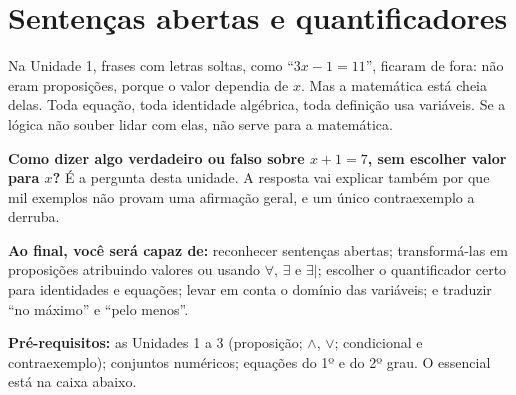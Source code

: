 \providecommand{\nao}{{\sim}}
\clearpage
\section{Sentenças abertas e quantificadores}

\Prefacio
\begin{prefacio}

Na Unidade 1, frases com letras soltas, como \enquote{$3x-1=11$}, ficaram de fora: não eram proposições, porque o valor dependia de $x$. Mas a matemática está cheia delas. Toda equação, toda identidade algébrica, toda definição usa variáveis. Se a lógica não souber lidar com elas, não serve para a matemática.

\textbf{Como dizer algo verdadeiro ou falso sobre $x+1=7$, sem escolher valor para $x$?} É a pergunta desta unidade. A resposta vai explicar também por que mil exemplos não provam uma afirmação geral, e um único contraexemplo a derruba.

\textbf{Ao final, você será capaz de:} reconhecer sentenças abertas; transformá-las em proposições atribuindo valores ou usando $\forall$, $\exists$ e $\exists|$; escolher o quantificador certo para identidades e equações; levar em conta o domínio das variáveis; e traduzir \enquote{no máximo} e \enquote{pelo menos}.

\textbf{Pré-requisitos:} as Unidades 1 a 3 (proposição; $\wedge$, $\vee$; condicional e contraexemplo); conjuntos numéricos; equações do 1º e do 2º grau. O essencial está na caixa abaixo.
\end{prefacio}

